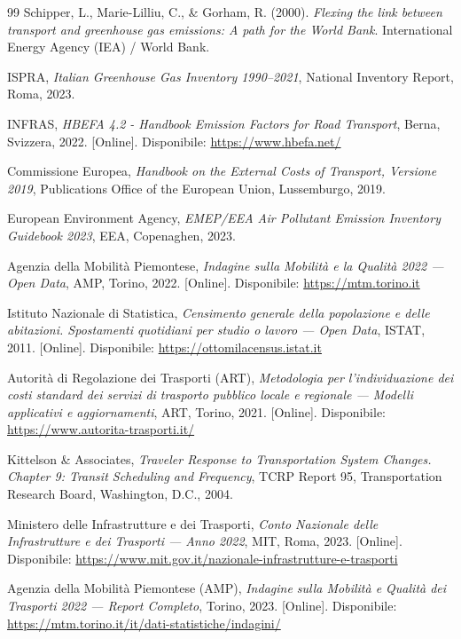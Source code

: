 \documentclass[conference]{IEEEtran}
\begin{document}
\begin{thebibliography}{99}
Schipper, L., Marie-Lilliu, C., \& Gorham, R. (2000). \textit{Flexing the link between transport and greenhouse gas emissions: A path for the World Bank}. International Energy Agency (IEA) / World Bank.

ISPRA,
\textit{Italian Greenhouse Gas Inventory 1990--2021},
National Inventory Report, Roma, 2023.

INFRAS,
\textit{HBEFA 4.2 - Handbook Emission Factors for Road Transport},
Berna, Svizzera, 2022. 
[Online]. Disponibile: \url{https://www.hbefa.net/}

Commissione Europea,
\textit{Handbook on the External Costs of Transport, Versione 2019},
Publications Office of the European Union, Lussemburgo, 2019.

European Environment Agency,
\textit{EMEP/EEA Air Pollutant Emission Inventory Guidebook 2023},
EEA, Copenaghen, 2023.

Agenzia della Mobilità Piemontese,
\textit{Indagine sulla Mobilità e la Qualità 2022 --- Open Data},
AMP, Torino, 2022.
[Online]. Disponibile: \url{https://mtm.torino.it}

Istituto Nazionale di Statistica,
\textit{Censimento generale della popolazione e delle abitazioni. Spostamenti quotidiani per studio o lavoro --- Open Data},
ISTAT, 2011.
[Online]. Disponibile: \url{https://ottomilacensus.istat.it}

Autorità di Regolazione dei Trasporti (ART),
\textit{Metodologia per l'individuazione dei costi standard dei servizi di trasporto pubblico locale e regionale --- Modelli applicativi e aggiornamenti},
ART, Torino, 2021.
[Online]. Disponibile: \url{https://www.autorita-trasporti.it/}

Kittelson \& Associates,
\textit{Traveler Response to Transportation System Changes. Chapter 9: Transit Scheduling and Frequency},
TCRP Report 95, Transportation Research Board, Washington, D.C., 2004.

Ministero delle Infrastrutture e dei Trasporti,
\textit{Conto Nazionale delle Infrastrutture e dei Trasporti --- Anno 2022},
MIT, Roma, 2023.
[Online]. Disponibile: \url{https://www.mit.gov.it/nazionale-infrastrutture-e-trasporti}

Agenzia della Mobilità Piemontese (AMP),
\textit{Indagine sulla Mobilità e Qualità dei Trasporti 2022 --- Report Completo},
Torino, 2023.
[Online]. Disponibile: \url{https://mtm.torino.it/it/dati-statistiche/indagini/}


\end{thebibliography}
\end{document}
